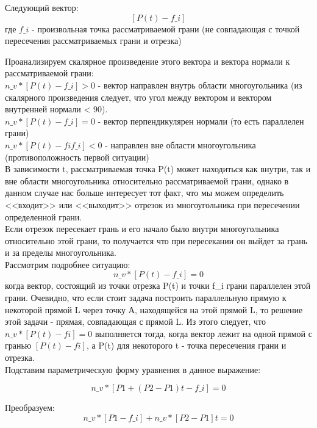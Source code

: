 \documentclass[a4paper,12pt]{article}
\begin{document}
	Следующий вектор: \[[P(t) - f\_i]\]
	где $f\_i$ - произвольная точка рассматриваемой грани (не совпадающая с точкой пересечения рассматриваемых грани и отрезка)
	\newpage
	
	Проанализируем скалярное произведение этого вектора и вектора нормали к рассматриваемой грани:\\
	
	$n\_v * [P(t) - f\_i] > 0$ - вектор направлен внутрь области многоугольника (из скалярного произведения следует, что угол между вектором и вектором внутренней нормали < 90).\\
	
	$n\_v * [P(t) - f\_i] = 0$ - вектор перпендикулярен нормали (то есть параллелен грани)\\
	
	$n\_v * [P(t) - fif\_i] < 0$ - направлен вне области многоугольника (противоположность первой ситуации)\\
	
	В зависимости t, рассматриваемая точка P(t) может находиться как внутри, так и вне области многоугольника относительно рассматриваемой грани, однако в данном случае нас больше интересует тот факт, что мы можем определить <<входит>> или <<выходит>> отрезок из многоугольника при пересечении определенной грани.\\
	
	Если отрезок пересекает грань и его начало было внутри многоугольника относительно этой грани, то получается что при пересекании он выйдет за грань и за пределы многоугольника.\\
	
	Рассмотрим подробнее ситуацию: 	\[n\_v*[P(t) - f\_i] = 0\] 
	когда вектор, состоящий из точки отрезка P(t) и точки  f\_i грани параллелен этой грани. Очевидно, что если стоит задача построить параллельную прямую к некоторой прямой L через точку А, находящейся на этой прямой L, то решение этой задачи - прямая, совпадающая с прямой L. Из этого следует, что 	$n\_v*[P(t) - fi] = 0$ выполняется тогда, когда вектор лежит на одной прямой с гранью $[P(t) - fi]$, а P(t) для некоторого t - точка пересечения грани и отрезка.\\
	
	Подставим параметрическую форму уравнения в данное выражение:
	
	\[n\_v * [P1 + (P2  - P1)t - f\_i] = 0\]
	
	Преобразуем:  	\[n\_v * [P1 - f\_i] + 	n\_v * [P2  - P1]t  = 0\]     \\           
	
\end{document}
